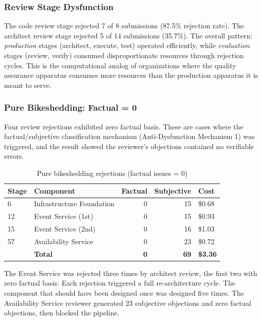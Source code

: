 \documentclass[11pt,a4paper]{article}
\begin{document}
\subsubsection{Review Stage Dysfunction}

The code review stage rejected 7 of 8 submissions (87.5\% rejection rate). The architect review stage rejected 5 of 14 submissions (35.7\%). The overall pattern: \emph{production} stages (architect, execute, test) operated efficiently, while \emph{evaluation} stages (review, verify) consumed disproportionate resources through rejection cycles. This is the computational analog of organizations where the quality assurance apparatus consumes more resources than the production apparatus it is meant to serve.

\subsubsection{Pure Bikeshedding: Factual = 0}

Four review rejections exhibited zero factual basis. These are cases where the factual/subjective classification mechanism (Anti-Dysfunction Mechanism 1) was triggered, and the result showed the reviewer's objections contained no verifiable errors.

\begin{table}[H]
\centering
\caption{Pure bikeshedding rejections (factual issues = 0)}
\label{tab:bikeshed}
\begin{tabular}{@{}llrrl@{}}
\toprule
\textbf{Stage} & \textbf{Component} & \textbf{Factual} & \textbf{Subjective} & \textbf{Cost} \\
\midrule
6  & Infrastructure Foundation & 0 & 15 & \$0.68 \\
12 & Event Service (1st) & 0 & 15 & \$0.93 \\
15 & Event Service (2nd) & 0 & 16 & \$1.03 \\
57 & Availability Service & 0 & 23 & \$0.72 \\
\midrule
   & \textbf{Total} & \textbf{0} & \textbf{69} & \textbf{\$3.36} \\
\bottomrule
\end{tabular}
\end{table}

The Event Service was rejected three times by architect review, the first two with zero factual basis. Each rejection triggered a full re-architecture cycle. The component that should have been designed once was designed five times. The Availability Service reviewer generated 23 subjective objections and zero factual objections, then blocked the pipeline.
\end{document}

